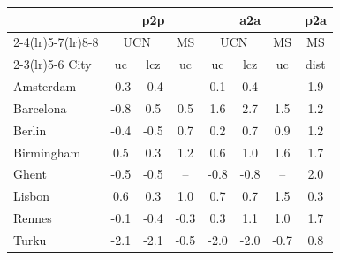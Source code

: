 \begin{table}[t]
\centering
\small
\begin{tabular}{lccc ccc c}
\toprule
& \multicolumn{3}{c}{p2p} & \multicolumn{3}{c}{a2a} & p2a \\
\cmidrule(lr){2-4}\cmidrule(lr){5-7}\cmidrule(lr){8-8}
& \multicolumn{2}{c}{UCN} & MS & \multicolumn{2}{c}{UCN} & MS & MS \\
\cmidrule(lr){2-3}\cmidrule(lr){5-6}
City & uc & lcz & uc & uc & lcz & uc & dist \\
\midrule
Amsterdam & \cellcolor[RGB]{201,215,238}-0.3 & \cellcolor[RGB]{194,212,243}-0.4 & \cellcolor[RGB]{221,220,219}-- & \cellcolor[RGB]{227,217,211}0.1 & \cellcolor[RGB]{242,200,179}0.4 & \cellcolor[RGB]{221,220,219}-- & \cellcolor[RGB]{184,17,41}1.9 \\
Barcelona & \cellcolor[RGB]{160,191,254}-0.8 & \cellcolor[RGB]{244,195,171}0.5 & \cellcolor[RGB]{245,193,168}0.5 & \cellcolor[RGB]{210,75,63}1.6 & \cellcolor[RGB]{179,3,38}2.7 & \cellcolor[RGB]{223,100,79}1.5 & \cellcolor[RGB]{236,128,100}1.2 \\
Berlin & \cellcolor[RGB]{189,210,246}-0.4 & \cellcolor[RGB]{185,208,248}-0.5 & \cellcolor[RGB]{247,181,152}0.7 & \cellcolor[RGB]{235,211,198}0.2 & \cellcolor[RGB]{246,182,154}0.7 & \cellcolor[RGB]{246,167,137}0.9 & \cellcolor[RGB]{236,128,100}1.2 \\
Birmingham & \cellcolor[RGB]{243,198,176}0.5 & \cellcolor[RGB]{236,209,195}0.3 & \cellcolor[RGB]{239,137,108}1.2 & \cellcolor[RGB]{246,188,162}0.6 & \cellcolor[RGB]{242,147,117}1.0 & \cellcolor[RGB]{216,86,70}1.6 & \cellcolor[RGB]{202,61,56}1.7 \\
Ghent & \cellcolor[RGB]{182,206,249}-0.5 & \cellcolor[RGB]{182,206,249}-0.5 & \cellcolor[RGB]{221,220,219}-- & \cellcolor[RGB]{160,191,254}-0.8 & \cellcolor[RGB]{160,191,254}-0.8 & \cellcolor[RGB]{221,220,219}-- & \cellcolor[RGB]{184,17,41}2.0 \\
Lisbon & \cellcolor[RGB]{246,188,162}0.6 & \cellcolor[RGB]{239,206,188}0.3 & \cellcolor[RGB]{242,147,117}1.0 & \cellcolor[RGB]{247,177,148}0.7 & \cellcolor[RGB]{247,181,152}0.7 & \cellcolor[RGB]{223,100,79}1.5 & \cellcolor[RGB]{238,207,190}0.3 \\
Rennes & \cellcolor[RGB]{213,219,229}-0.1 & \cellcolor[RGB]{194,212,243}-0.4 & \cellcolor[RGB]{198,214,241}-0.3 & \cellcolor[RGB]{236,210,196}0.3 & \cellcolor[RGB]{242,145,115}1.1 & \cellcolor[RGB]{244,157,126}1.0 & \cellcolor[RGB]{206,68,60}1.7 \\
Turku & \cellcolor[RGB]{58,76,192}-2.1 & \cellcolor[RGB]{58,76,192}-2.1 & \cellcolor[RGB]{179,204,250}-0.5 & \cellcolor[RGB]{221,220,219}-2.0 & \cellcolor[RGB]{221,220,219}-2.0 & \cellcolor[RGB]{221,220,219}-0.7 & \cellcolor[RGB]{246,167,137}0.8 \\

\end{tabular}
\end{table}
